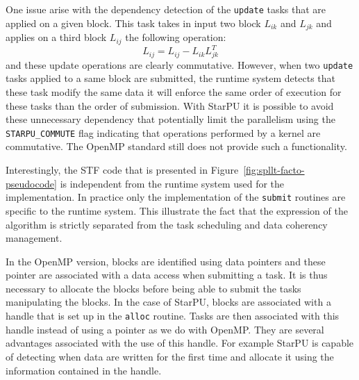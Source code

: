 \documentclass{article}
\newcommand{\starpu}{{StarPU}\xspace}
\newcommand{\openmp}{OpenMP\xspace}
\begin{document}
One issue arise with the dependency detection of the \texttt{update}
tasks that are applied on a given block. This task takes in input two
block $L_{ik}$ and $L_{jk}$ and applies on a third block $L_{ij}$ the
following operation:
\begin{equation*}
  L_{ij} = L_{ij} - L_{ik}L_{jk}^{T}
\end{equation*}
and these update operations are clearly commutative. However, when two
\texttt{update} tasks applied to a same block are submitted, the
runtime system detects that these task modify the same data it will
enforce the same order of execution for these tasks than the order of
submission. With StarPU it is possible to avoid these unnecessary
dependency that potentially limit the parallelism using the
\texttt{STARPU\_COMMUTE} flag indicating that operations performed by
a kernel are commutative. The OpenMP standard still does not provide
such a functionality.

Interestingly, the STF code that is presented in
Figure~\ref{fig:spllt-facto-pseudocode} is independent from the
runtime system used for the implementation. In practice only the
implementation of the \texttt{submit} routines are specific to the
runtime system. This illustrate the fact that the expression of the
algorithm is strictly separated from the task scheduling and data
coherency management.

In the \openmp version, blocks are identified using data pointers and
these pointer are associated with a data access when submitting a
task. It is thus necessary to allocate the blocks before being able to
submit the tasks manipulating the blocks. In the case of \starpu,
blocks are associated with a handle that is set up in the
\texttt{alloc} routine. Tasks are then associated with this handle
instead of using a pointer as we do with \openmp. They are several
advantages associated with the use of this handle. For example \starpu
is capable of detecting when data are written for the first time and
allocate it using the information contained in the handle.

\end{document}
